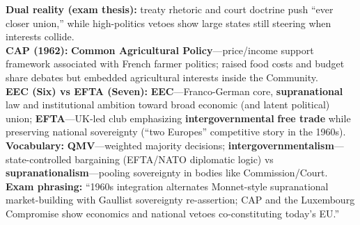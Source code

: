 \documentclass[10pt,a4paper]{article}
\begin{document}
{\textbf{Dual reality (exam thesis):} treaty rhetoric and court doctrine push ``ever closer union,'' while high-politics vetoes show large states still steering when interests collide.\\
\textbf{CAP (1962):} \textbf{Common Agricultural Policy}---price/income support framework associated with French farmer politics; raised food costs and budget share debates but embedded agricultural interests inside the Community.\\
\textbf{EEC (Six) vs EFTA (Seven):} \textbf{EEC}---Franco-German core, \textbf{supranational} law and institutional ambition toward broad economic (and latent political) union; \textbf{EFTA}---UK-led club emphasizing \textbf{intergovernmental} \textbf{free trade} while preserving national sovereignty (``two Europes'' competitive story in the 1960s).\\
\textbf{Vocabulary:} \textbf{QMV}---weighted majority decisions; \textbf{intergovernmentalism}---state-controlled bargaining (EFTA/NATO diplomatic logic) vs \textbf{supranationalism}---pooling sovereignty in bodies like Commission/Court.\\
\textbf{Exam phrasing:} ``1960s integration alternates Monnet-style supranational market-building with Gaullist sovereignty re-assertion; CAP and the Luxembourg Compromise show economics and national vetoes co-constituting today's EU.''
}
\end{document}
